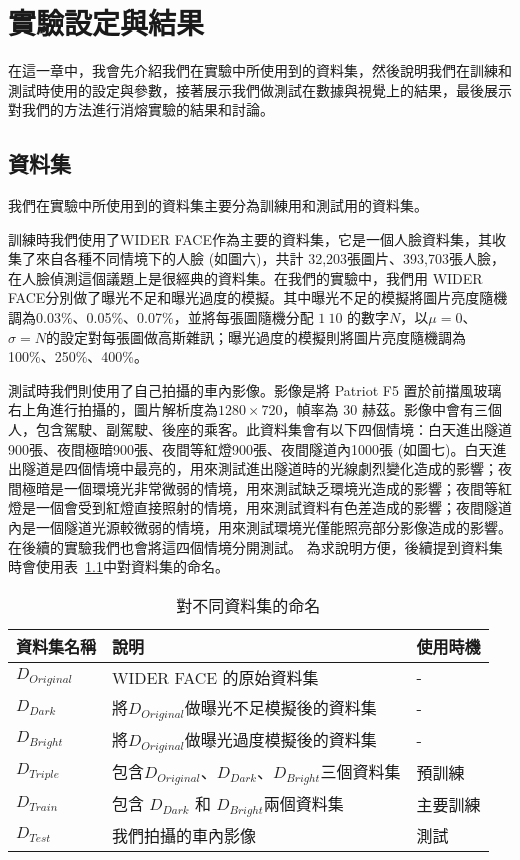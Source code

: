 \chapter{實驗設定與結果}
\label{c:experiment}

在這一章中，我會先介紹我們在實驗中所使用到的資料集，然後說明我們在訓練和測試時使用的設定與參數，接著展示我們做測試在數據與視覺上的結果，最後展示對我們的方法進行消熔實驗的結果和討論。

\section{資料集}

我們在實驗中所使用到的資料集主要分為訓練用和測試用的資料集。

訓練時我們使用了WIDER FACE作為主要的資料集，它是一個人臉資料集，其收集了來自各種不同情境下的人臉 (如圖六)，共計 32,203張圖片、393,703張人臉，在人臉偵測這個議題上是很經典的資料集。在我們的實驗中，我們用 WIDER FACE分別做了曝光不足和曝光過度的模擬。其中曝光不足的模擬將圖片亮度隨機調為0.03\%、0.05\%、0.07\%，並將每張圖隨機分配 $1~10$ 的數字$N$，以$\mu= 0$、$\sigma = N$的設定對每張圖做高斯雜訊；曝光過度的模擬則將圖片亮度隨機調為100\%、250\%、400\%。

測試時我們則使用了自己拍攝的車內影像。影像是將 Patriot F5 置於前擋風玻璃右上角進行拍攝的，圖片解析度為$1280 \times 720$，幀率為 30 赫茲。影像中會有三個人，包含駕駛、副駕駛、後座的乘客。此資料集會有以下四個情境：白天進出隧道900張、夜間極暗900張、夜間等紅燈900張、夜間隧道內1000張 (如圖七)。白天進出隧道是四個情境中最亮的，用來測試進出隧道時的光線劇烈變化造成的影響；夜間極暗是一個環境光非常微弱的情境，用來測試缺乏環境光造成的影響；夜間等紅燈是一個會受到紅燈直接照射的情境，用來測試資料有色差造成的影響；夜間隧道內是一個隧道光源較微弱的情境，用來測試環境光僅能照亮部分影像造成的影響。在後續的實驗我們也會將這四個情境分開測試。
為求說明方便，後續提到資料集時會使用表~\ref{table:model_names}中對資料集的命名。
\begin{table}[ht]
    \caption{對不同資料集的命名}
    \centering
    \begin{tabular}{l l l}
        \hline
        資料集名稱 & 說明 & 使用時機 \\
        \hline
        $D_{Original}$ & WIDER FACE 的原始資料集 & - \\
        $D_{Dark}$ & 將$D_{Original}$做曝光不足模擬後的資料集 & - \\
        $D_{Bright}$ & 將$D_{Original}$做曝光過度模擬後的資料集 & - \\
        $D_{Triple}$ & 包含$D_{Original}$、$D_{Dark}$、$D_{Bright}$三個資料集 & 預訓練 \\
        $D_{Train}$	& 包含 $D_{Dark}$ 和 $D_{Bright}$兩個資料集 & 主要訓練 \\
        $D_{Test}$ & 我們拍攝的車內影像 & 測試 \\
        \hline
    \end{tabular}
    \label{table:model_names}
\end{table}

